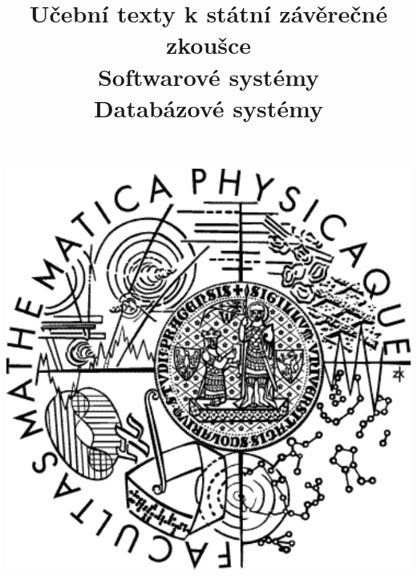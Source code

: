 \clearpage

\clearpage

\title{\LARGE Učební texty k státní závěrečné zkoušce \\ Softwarové systémy \\ Databázové systémy}




\maketitle

\vspace{10mm}
\begin{center}
\includegraphics[scale=0.5]{../common/logo.pdf}
\end{center} 

\clearpage

\clearpage

\tableofcontents





